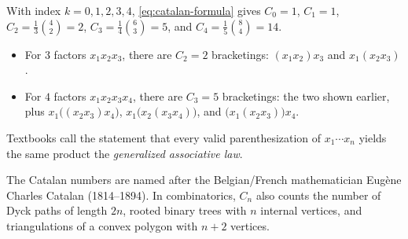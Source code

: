\begin{content}

\begin{steps}
With index $k = 0, 1, 2, 3, 4$, \eqref{eq:catalan-formula} gives $C_0 = 1$, $C_1 = 1$, $C_2 = \frac{1}{3}\binom{4}{2} = 2$, $C_3 = \frac{1}{4}\binom{6}{3} = 5$, and $C_4 = \frac{1}{5}\binom{8}{4} = 14$.
\begin{itemize}
    \item For $3$ factors $x_1 x_2 x_3$, there are $C_2 = 2$ bracketings: $(x_1 x_2)x_3$ and $x_1(x_2 x_3)$.
    \item For $4$ factors $x_1 x_2 x_3 x_4$, there are $C_3 = 5$ bracketings: the two shown earlier, plus $x_1\bigl((x_2 x_3) x_4\bigr)$, $x_1\bigl(x_2 (x_3 x_4)\bigr)$, and $\bigl(x_1(x_2 x_3)\bigr) x_4$.
\end{itemize}
\end{steps}
\end{content}

\begin{aiNote}
Textbooks call the statement that every valid parenthesization of $x_1 \cdots x_n$ yields the same product the \emph{generalized associative law}.
\end{aiNote}

\begin{aiNote}
The Catalan numbers are named after the Belgian/French mathematician Eugène Charles Catalan (1814--1894). In combinatorics, $C_n$ also counts the number of Dyck paths of length $2n$, rooted binary trees with $n$ internal vertices, and triangulations of a convex polygon with $n+2$ vertices.
\end{aiNote}

